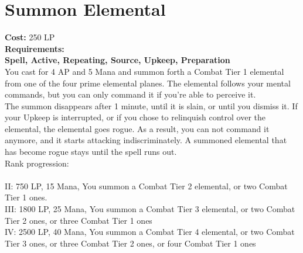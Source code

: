 \section{Summon Elemental}\label{spell:summonElemental}
\textbf{Cost:} 250 LP\\
\textbf{Requirements:} \\
\textbf{Spell, Active, Repeating, Source, Upkeep, Preparation}\\
You cast for 4 AP and 5 Mana and summon forth a Combat Tier 1 elemental from one of the four prime elemental planes.
The elemental follows your mental commands, but you can only command it if you're able to perceive it.\\
The summon disappears after 1 minute, until it is slain, or until you dismiss it.
If your Upkeep is interrupted, or if you chose to relinquish control over the elemental, the elemental goes rogue.
As a result, you can not command it anymore, and it starts attacking indiscriminately.
A summoned elemental that has become rogue stays until the spell runs out.
\\
Rank progression:\\
\\
II: 750 LP, 15 Mana, You summon a Combat Tier 2 elemental, or two Combat Tier 1 ones.\\
III: 1800 LP, 25 Mana, You summon a Combat Tier 3 elemental, or two Combat Tier 2 ones, or three Combat Tier 1 ones\\
IV: 2500 LP, 40 Mana, You summon a Combat Tier 4 elemental, or two Combat Tier 3 ones, or three Combat Tier 2 ones, or four Combat Tier 1 ones\\